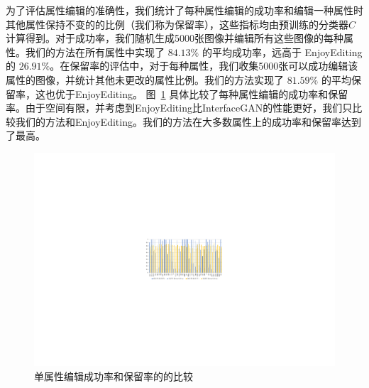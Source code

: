 为了评估属性编辑的准确性，我们统计了每种属性编辑的成功率和编辑一种属性时其他属性保持不变的的比例（我们称为保留率），这些指标均由预训练的分类器$C$计算得到。对于成功率，我们随机生成5000张图像并编辑所有这些图像的每种属性。我们的方法在所有属性中实现了 $84.13\%$ 的平均成功率，远高于 En​​joyEditing 的 $26.91\%$。在保留率的评估中，对于每种属性，我们收集5000张可以成功编辑该属性的图像，并统计其他未更改的属性比例。我们的方法实现了 $81.59\%$ 的平均保留率，这也优于EnjoyEditing。 图~\ref{fig:histogram} 具体比较了每种属性编辑的成功率和保留率。由于空间有限，并考虑到EnjoyEditing比InterfaceGAN的性能更好，我们只比较我们的方法和EnjoyEditing。我们的方法在大多数属性上的成功率和保留率达到了最高。

\begin{figure}[!t]
    \begin{center}
         \includegraphics[width=1\linewidth]{figures/ACGAN/excel_histogram.pdf}
    \end{center}
    \caption{单属性编辑成功率和保留率的的比较}
    \label{fig:histogram}
\end{figure}


